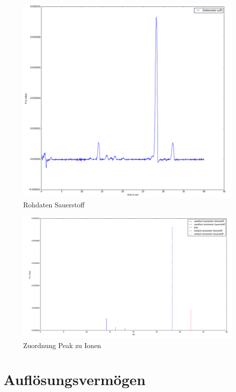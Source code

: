 \documentclass[10pt,a4paper]{article}
\begin{document}
\begin{figure}[h]
	\includegraphics[scale = 0.5]{sauerroh.png}
	\centering
	\caption{Rohdaten Sauerstoff}
	\label{f1}
\end{figure}

\begin{figure}[h]
	\includegraphics[scale = 0.5]{sauerstoff.png}
	\centering
	\caption{Zuordnung Peak zu Ionen}
	\label{f2}
\end{figure}
	

\section{Auflösungsvermögen}
\end{document}
